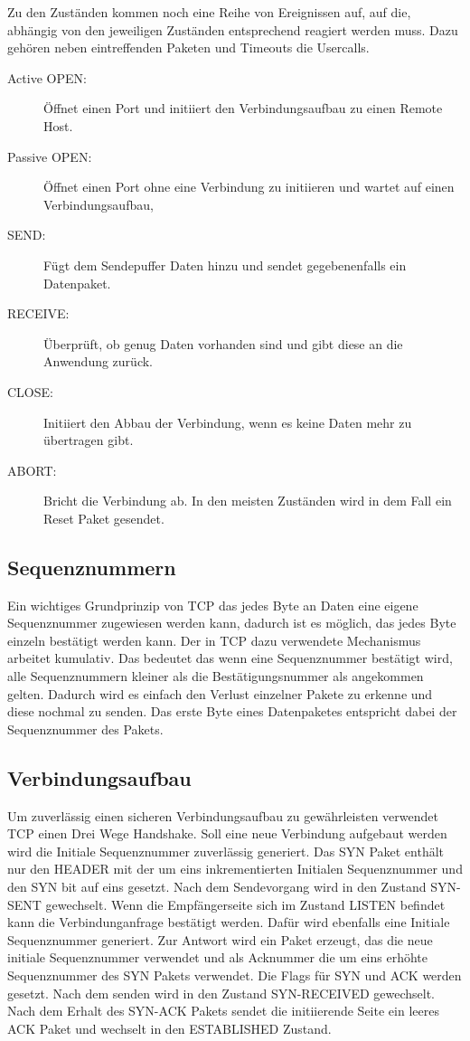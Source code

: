 Zu den Zuständen kommen noch eine Reihe von Ereignissen auf, auf die, abhängig von den jeweiligen Zuständen entsprechend reagiert werden muss. 
Dazu gehören neben eintreffenden Paketen und Timeouts die Usercalls.
\begin{description}
\item[Active OPEN: ]Öffnet einen Port und initiiert den Verbindungsaufbau zu einen Remote Host.
\item[Passive OPEN: ] Öffnet einen Port ohne eine Verbindung zu initiieren und wartet auf einen Verbindungsaufbau,
\item[SEND: ] Fügt dem Sendepuffer Daten hinzu und sendet gegebenenfalls ein Datenpaket.
\item[RECEIVE: ] Überprüft, ob genug Daten vorhanden sind und gibt diese an die Anwendung zurück.
\item[CLOSE: ] Initiiert den Abbau der Verbindung, wenn es keine Daten mehr zu  übertragen gibt.
\item[ABORT: ] Bricht die Verbindung ab. In den meisten Zuständen wird in dem Fall ein Reset Paket gesendet.
\end{description}
\subsection{Sequenznummern}
Ein wichtiges Grundprinzip von TCP das jedes Byte an Daten eine eigene Sequenznummer zugewiesen werden kann, dadurch ist es möglich, das jedes Byte einzeln bestätigt werden kann. Der in TCP dazu verwendete Mechanismus arbeitet kumulativ. Das bedeutet das wenn eine Sequenznummer bestätigt wird, alle Sequenznummern kleiner als die Bestätigungsnummer als angekommen gelten. Dadurch wird es einfach den Verlust einzelner Pakete zu erkenne und diese nochmal zu senden. Das erste Byte eines Datenpaketes entspricht dabei der Sequenznummer des Pakets. 

\subsection{Verbindungsaufbau}
Um zuverlässig einen sicheren Verbindungsaufbau zu gewährleisten verwendet TCP einen Drei Wege Handshake. Soll eine neue Verbindung aufgebaut werden wird die Initiale Sequenznummer zuverlässig generiert. Das SYN Paket enthält nur den HEADER mit der um eins inkrementierten Initialen Sequenznummer und den SYN bit auf eins gesetzt. Nach dem Sendevorgang wird in den Zustand SYN-SENT gewechselt. Wenn die Empfängerseite sich im Zustand LISTEN befindet kann die Verbindunganfrage bestätigt werden. Dafür wird ebenfalls eine Initiale Sequenznummer generiert. Zur Antwort wird ein Paket erzeugt, das die neue initiale Sequenznummer verwendet und als Acknummer die um eins erhöhte Sequenznummer des SYN Pakets verwendet. Die Flags für SYN und ACK werden gesetzt. Nach dem senden wird in den Zustand SYN-RECEIVED gewechselt.\\
Nach dem Erhalt des SYN-ACK Pakets sendet die initiierende Seite ein leeres ACK Paket und wechselt in den ESTABLISHED Zustand. 

